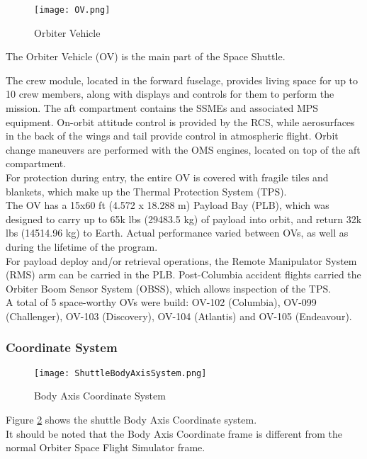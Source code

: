 \documentclass[Space_Shuttle_Vessel_Manual.tex]{subfiles}
\begin{document}
\begin{figure}[b!]
  \texttt{[image: OV.png]}
  \caption{Orbiter Vehicle}
  \label{fig:OV}
\end{figure}
\begin{multicols*}{2}
The Orbiter Vehicle (OV) is the main part of the Space Shuttle.


The crew module, located in the forward fuselage, provides living space for up to 10 crew members, along with displays and controls for them to perform the mission.
The aft compartment contains the SSMEs and associated MPS equipment.
On-orbit attitude control is provided by the RCS, while aerosurfaces in the back of the wings and tail provide control in atmospheric flight.
Orbit change maneuvers are performed with the OMS engines, located on top of the aft compartment.\\
For protection during entry, the entire OV is covered with fragile tiles and blankets, which make up the Thermal Protection System (TPS).\\
The OV has a 15x60 ft (4.572 x 18.288 m) Payload Bay (PLB), which was designed to carry up to 65k lbs (29483.5 kg) of payload into orbit, and return 32k lbs (14514.96 kg) to Earth. Actual performance varied between OVs, as well as during the lifetime of the program.\\
For payload deploy and/or retrieval operations, the Remote Manipulator System (RMS) arm can be carried in the PLB. Post-Columbia accident flights carried the Orbiter Boom Sensor System (OBSS), which allows inspection of the TPS.\\
A total of 5 space-worthy OVs were build: OV-102 (Columbia), OV-099 (Challenger), OV-103 (Discovery), OV-104 (Atlantis) and OV-105 (Endeavour).\\


\subsubsection{Coordinate System}
\begin{figure}[H]
  \texttt{[image: ShuttleBodyAxisSystem.png]}
  \caption{Body Axis Coordinate System}
  \label{fig:BodyAxisSystem}
\end{figure}
Figure \ref{fig:BodyAxisSystem} shows the shuttle Body Axis Coordinate system.\\
It should be noted that the Body Axis Coordinate frame is different from the normal Orbiter Space Flight Simulator frame.



\end{multicols*}
\end{document}
